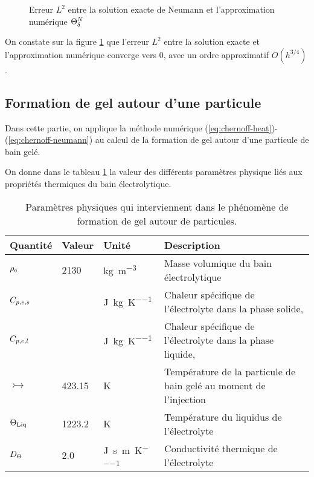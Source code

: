 \begin{figure}
  \begin{center}
    
    \caption{Erreur $L^2$ entre la solution exacte de Neumann et
      l'approximation numérique $\Theta^N_\delta$}
    \label{fig:neumann-convergence}
  \end{center}
\end{figure}

On constate sur la figure \ref{fig:neumann-convergence} que l'erreur
$L^2$ entre la solution exacte et l'approximation numérique converge
vers 0, avec un ordre approximatif $O(h^{3/4})$.




\subsection*{Formation de gel autour d'une particule}
Dans cette partie, on applique la méthode numérique
(\ref{eq:chernoff-heat})-(\ref{eq:chernoff-neumann}) au calcul de
la formation de gel autour d'une particule de bain gelé.

On donne dans le tableau \ref{tab:freeze-physical-parameters} la
valeur des différents paramètres physique liés aux propriétés
thermiques du bain électrolytique.

\begin{table}
  \begin{center}
    \caption{Paramètres physiques qui interviennent dans le
      phénomène de formation de gel autour de particules.}
    \label{tab:freeze-physical-parameters}
  \begin{tabularx}{\textwidth}{@{}lllX@{}}
    \toprule
    Quantité          & Valeur     & Unité                           & Description \\
    \midrule
    $\rho_\mathrm{e}$         & \num{2130} & \si{\kg\per\cubic\meter}        & Masse volumique du bain électrolytique\\
    $C_{p,e,s}$ & \num{} & \si{\joule\per\kilo\gram\per\kelvin} & Chaleur spécifique de  l'électrolyte dans la phase solide,\\
    $C_{p,e,l}$ & \num{} & \si{\joule\per\kilo\gram\per\kelvin} & Chaleur spécifique de
    l'électrolyte dans la phase liquide,\\
    $\tinj$ & \num{423.15} & \si{\kelvin} & Température de la
    particule de bain gelé au moment de l'injection\\
    $\Theta_\text{Liq}$ & \num{1223.2} & \si{\kelvin} & Température du liquidus de
    l'électrolyte\\
    $D_\Theta$ & \num{2.0} & \si{\joule\per\second\per\meter\per\kelvin} & Conductivité thermique de l'électrolyte \\
    \bottomrule
  \end{tabularx}
\end{center}
\end{table}

